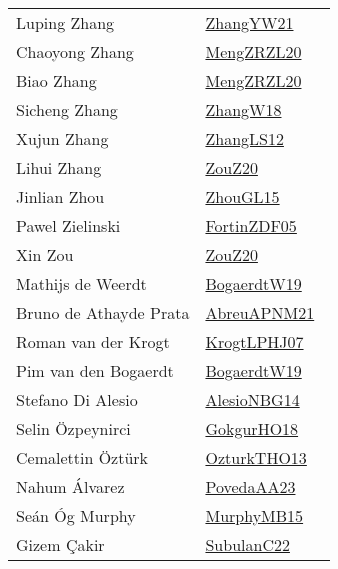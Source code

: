 {\begin{longtable}{p{4cm}p{20cm}}
Luping Zhang & \href{works/ZhangYW21.pdf}{ZhangYW21}~\cite{ZhangYW21}\\
Chaoyong Zhang & \href{works/MengZRZL20.pdf}{MengZRZL20}~\cite{MengZRZL20}\\
Biao Zhang & \href{works/MengZRZL20.pdf}{MengZRZL20}~\cite{MengZRZL20}\\
Sicheng Zhang & \href{works/ZhangW18.pdf}{ZhangW18}~\cite{ZhangW18}\\
Xujun Zhang & \href{works/ZhangLS12.pdf}{ZhangLS12}~\cite{ZhangLS12}\\
Lihui Zhang & \href{works/ZouZ20.pdf}{ZouZ20}~\cite{ZouZ20}\\
Jinlian Zhou & \href{works/ZhouGL15.pdf}{ZhouGL15}~\cite{ZhouGL15}\\
Pawel Zielinski & \href{works/FortinZDF05.pdf}{FortinZDF05}~\cite{FortinZDF05}\\
Xin Zou & \href{works/ZouZ20.pdf}{ZouZ20}~\cite{ZouZ20}\\
Mathijs de Weerdt & \href{works/BogaerdtW19.pdf}{BogaerdtW19}~\cite{BogaerdtW19}\\
Bruno de Athayde Prata & \href{works/AbreuAPNM21.pdf}{AbreuAPNM21}~\cite{AbreuAPNM21}\\
Roman van der Krogt & \href{works/KrogtLPHJ07.pdf}{KrogtLPHJ07}~\cite{KrogtLPHJ07}\\
Pim van den Bogaerdt & \href{works/BogaerdtW19.pdf}{BogaerdtW19}~\cite{BogaerdtW19}\\
Stefano {Di Alesio} & \href{works/AlesioNBG14.pdf}{AlesioNBG14}~\cite{AlesioNBG14}\\
Selin {\"{O}}zpeynirci & \href{works/GokgurHO18.pdf}{GokgurHO18}~\cite{GokgurHO18}\\
Cemalettin {\"{O}}zt{\"{u}}rk & \href{works/OzturkTHO13.pdf}{OzturkTHO13}~\cite{OzturkTHO13}\\
Nahum {\'{A}}lvarez & \href{works/PovedaAA23.pdf}{PovedaAA23}~\cite{PovedaAA23}\\
Se{\'{a}}n {\'{O}}g Murphy & \href{works/MurphyMB15.pdf}{MurphyMB15}~\cite{MurphyMB15}\\
Gizem {\c{C}}akir & \href{works/SubulanC22.pdf}{SubulanC22}~\cite{SubulanC22}\\
\end{longtable}
}

